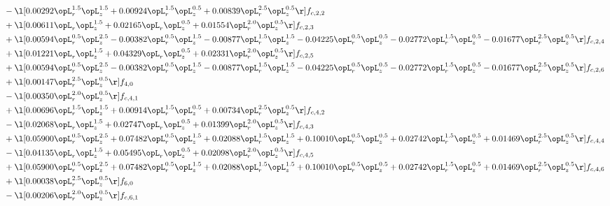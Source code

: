\begin{alignat}{2}
& - \l[  0.00292 \opL_r^{1.5} \opL_z^{1.5} +  0.00924 \opL_r^{1.5} \opL_z^{0.5} +  0.00839 \opL_r^{2.5} \opL_z^{0.5}  \r] f_{c,2,2} \nonumber \\ 
& + \l[  0.00611 \opL_r \opL_z^{1.5} +  0.02165 \opL_r \opL_z^{0.5} +  0.01554 \opL_r^{2.0} \opL_z^{0.5}  \r] f_{c,2,3} \nonumber \\ 
& + \l[  0.00594 \opL_r^{0.5} \opL_z^{2.5}   -0.00382 \opL_r^{0.5} \opL_z^{1.5}   -0.00877 \opL_r^{1.5} \opL_z^{1.5}   -0.04225 \opL_r^{0.5} \opL_z^{0.5}   -0.02772 \opL_r^{1.5} \opL_z^{0.5}   -0.01677 \opL_r^{2.5} \opL_z^{0.5}  \r] f_{c,2,4} \nonumber \\ 
& + \l[  0.01221 \opL_r \opL_z^{1.5} +  0.04329 \opL_r \opL_z^{0.5} +  0.02331 \opL_r^{2.0} \opL_z^{0.5}  \r] f_{c,2,5} \nonumber \\ 
& + \l[  0.00594 \opL_r^{0.5} \opL_z^{2.5}   -0.00382 \opL_r^{0.5} \opL_z^{1.5}   -0.00877 \opL_r^{1.5} \opL_z^{1.5}   -0.04225 \opL_r^{0.5} \opL_z^{0.5}   -0.02772 \opL_r^{1.5} \opL_z^{0.5}   -0.01677 \opL_r^{2.5} \opL_z^{0.5}  \r] f_{c,2,6} \nonumber \\ 
& + \l[  0.00147 \opL_r^{2.5} \opL_z^{0.5}  \r] f_{4,0} \nonumber \\ 
& - \l[  0.00350 \opL_r^{2.0} \opL_z^{0.5}  \r] f_{c,4,1} \nonumber \\ 
& + \l[  0.00696 \opL_r^{1.5} \opL_z^{1.5} +  0.00914 \opL_r^{1.5} \opL_z^{0.5} +  0.00734 \opL_r^{2.5} \opL_z^{0.5}  \r] f_{c,4,2} \nonumber \\ 
& - \l[  0.02068 \opL_r \opL_z^{1.5} +  0.02747 \opL_r \opL_z^{0.5} +  0.01399 \opL_r^{2.0} \opL_z^{0.5}  \r] f_{c,4,3} \nonumber \\ 
& + \l[  0.05900 \opL_r^{0.5} \opL_z^{2.5} +  0.07482 \opL_r^{0.5} \opL_z^{1.5} +  0.02088 \opL_r^{1.5} \opL_z^{1.5} +  0.10010 \opL_r^{0.5} \opL_z^{0.5} +  0.02742 \opL_r^{1.5} \opL_z^{0.5} +  0.01469 \opL_r^{2.5} \opL_z^{0.5}  \r] f_{c,4,4} \nonumber \\ 
& - \l[  0.04135 \opL_r \opL_z^{1.5} +  0.05495 \opL_r \opL_z^{0.5} +  0.02098 \opL_r^{2.0} \opL_z^{0.5}  \r] f_{c,4,5} \nonumber \\ 
& + \l[  0.05900 \opL_r^{0.5} \opL_z^{2.5} +  0.07482 \opL_r^{0.5} \opL_z^{1.5} +  0.02088 \opL_r^{1.5} \opL_z^{1.5} +  0.10010 \opL_r^{0.5} \opL_z^{0.5} +  0.02742 \opL_r^{1.5} \opL_z^{0.5} +  0.01469 \opL_r^{2.5} \opL_z^{0.5}  \r] f_{c,4,6} \nonumber \\ 
& + \l[  0.00038 \opL_r^{2.5} \opL_z^{0.5}  \r] f_{6,0} \nonumber \\ 
& - \l[  0.00206 \opL_r^{2.0} \opL_z^{0.5}  \r] f_{c,6,1} \nonumber \\ 

\end{alignat}
